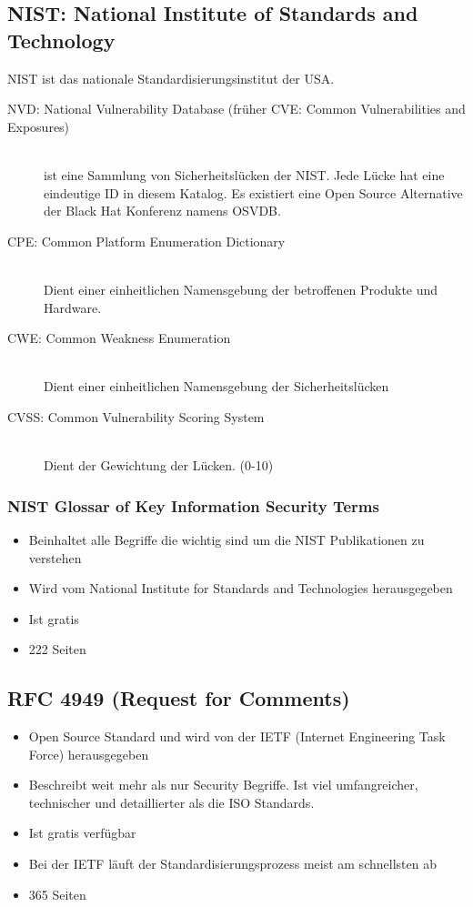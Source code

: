 \subsection{NIST: National Institute of Standards and Technology}
NIST ist das nationale Standardisierungsinstitut der USA.
\begin{description}
	\item[NVD: National Vulnerability Database (früher CVE: Common Vulnerabilities and Exposures)] \hfill \\
	ist eine Sammlung von Sicherheitslücken der NIST. Jede Lücke hat eine eindeutige ID in diesem Katalog. Es existiert eine Open Source Alternative der Black Hat Konferenz namens OSVDB.
	\item[CPE: Common Platform Enumeration Dictionary] \hfill \\ Dient einer einheitlichen Namensgebung der betroffenen Produkte und Hardware.
	\item[CWE: Common Weakness Enumeration] \hfill \\ Dient einer einheitlichen Namensgebung der Sicherheitslücken
	\item[CVSS: Common Vulnerability Scoring System] \hfill \\ Dient der Gewichtung der Lücken. (0-10)	
\end{description}

\subsubsection{NIST Glossar of Key Information Security Terms}
\begin{itemize}
	\item Beinhaltet alle Begriffe die wichtig sind um die NIST Publikationen zu verstehen
	\item Wird vom National Institute for Standards and Technologies herausgegeben
	\item Ist gratis
	\item 222 Seiten
\end{itemize}

\subsection{RFC 4949 (Request for Comments)}
\begin{itemize}
	\item Open Source Standard und wird von der IETF (Internet Engineering Task Force) herausgegeben
	\item Beschreibt weit mehr als nur Security Begriffe. Ist viel umfangreicher, technischer und detaillierter als die ISO Standards.
	\item Ist gratis verfügbar
	\item Bei der IETF läuft der Standardisierungsprozess meist am schnellsten ab
	\item 365 Seiten
\end{itemize}

